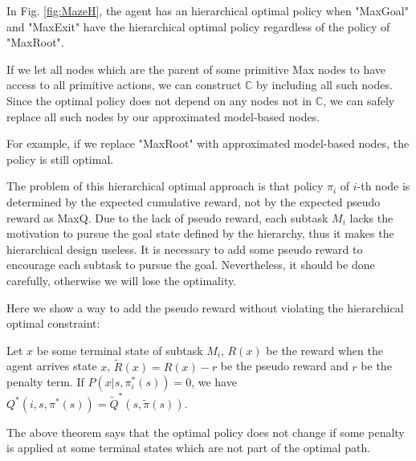 
In Fig. \ref{fig:MazeH}, the agent has an hierarchical optimal policy when "MaxGoal" and "MaxExit"
have the hierarchical optimal policy regardless of the policy of "MaxRoot".

If we let all nodes which are the parent of some primitive Max nodes to have access
to all primitive actions, we can construct $\mathbb{C}$ by including all 
such nodes. Since the optimal policy does not depend on any nodes not in $\mathbb{C}$, 
we can safely replace all such nodes by our approximated model-based nodes.

For example, if we replace "MaxRoot" with approximated model-based nodes,
the policy is still optimal. 

The problem of this hierarchical optimal approach is that policy $\pi_i$ of $i$-th
node is determined by the expected cumulative reward, not by the expected pseudo reward as
MaxQ. Due to the lack of pseudo reward, each subtask $M_i$ lacks the motivation to 
pursue the goal state defined by the hierarchy, thus it makes the hierarchical 
design useless. 
It is necessary to add some pseudo reward to encourage each subtask to pursue 
the goal. Nevertheless, it should be done carefully, otherwise we will lose
the optimality.

Here we show a way to add the pseudo reward without violating the hierarchical 
optimal constraint:
\begin{theorem}
    Let $x$ be some terminal state of subtask $M_i$, $R(x)$ be the reward
    when the agent arrives state $x$, $\tilde{R}(x) = R(x) - r$ be the pseudo reward
    and $r$ be the penalty term.
    If $P(x| s, \pi_i^*(s)) = 0$, we have $Q^*(i, s, \pi^*(s)) = \tilde{Q}^*(s, \tilde{\pi}(s))$.
\end{theorem}

The above theorem says that the optimal policy does not change 
if some penalty is applied at some terminal states which are not part of the optimal path.


